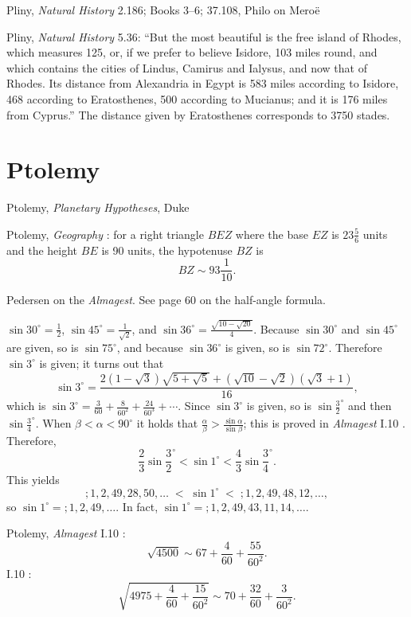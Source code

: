 \documentclass{article}
\theoremstyle{definition}
\begin{document}
Pliny, {\em Natural History} 2.186; Books 3--6; 37.108, Philo on Mero\"e

Pliny, {\em Natural History} 5.36: ``But the most beautiful is the free island of Rhodes, which measures 125, or, if we prefer to believe
Isidore, 103 miles round, and which contains the cities of Lindus, Camirus and Ialysus, and now that
of Rhodes. Its distance from Alexandria in Egypt
is 583 miles according to Isidore, 468 according to Eratosthenes, 500 according to Mucianus; and it is 176 miles from Cyprus.''
The distance given by Eratosthenes corresponds to 3750 stades.




\section{Ptolemy}
Ptolemy, {\em Planetary Hypotheses}, Duke \cite{duke}

Ptolemy, {\em Geography} \cite[p.~90]{geography}: for a right triangle $BEZ$ where the base $EZ$ is $23 \frac{5}{6}$ units and the height
$BE$ is 90 units, the hypotenuse $BZ$ is
\[
BZ \sim 93 \frac{1}{10}.
\]

Pedersen \cite{pedersen} on the {\em Almagest}. See page 60 on the half-angle formula.

$\sin 30^\circ = \frac{1}{2}$, $\sin 45^\circ = \frac{1}{\sqrt{2}}$, and $\sin 36^\circ = \frac{\sqrt{10-\sqrt{20}}}{4}$.
Because
$\sin 30^\circ$ and $\sin 45^\circ$ are given, so is $\sin 75^\circ$, and because
$\sin 36^\circ$ is given, so is $\sin 72^\circ$. Therefore
$\sin 3^\circ$ is given; it turns out that
\[
\sin 3^\circ = \frac{2(1-\sqrt{3})\sqrt{5+\sqrt{5}}+(\sqrt{10}-\sqrt{2})(\sqrt{3}+1)}{16},
\] 
which is $\sin 3^\circ = \frac{3}{60}+\frac{8}{60^2}+\frac{24}{60^3}+\cdots$.
Since $\sin 3^\circ$ is given, so is $\sin \frac{3}{2}^\circ$ and then
$\sin \frac{3}{4}^\circ$.  When $\beta<\alpha<90^\circ$ it holds that
$\frac{\alpha}{\beta}>\frac{\sin \alpha}{\sin \beta}$;
this is proved in {\em Almagest} I.10 \cite[pp.~54--55]{almagest}.
Therefore,
\[
\frac{2}{3} \sin \frac{3}{2}^\circ < \sin 1^\circ < \frac{4}{3}\sin \frac{3}{4}^\circ.
\]
This yields
\[
;1,2,49,28,50,\ldots \; < \; \sin 1^\circ  \; < \; ;1,2,49,48,12,\ldots,
\]
so $\sin 1^\circ = ;1,2,49,\ldots$. In fact, $\sin 1^\circ = ;1,2,49,43,11,14,\ldots$. 

Ptolemy, {\em Almagest} I.10 \cite[p.~49]{almagest}:
\[
\sqrt{4500} \sim 67+\frac{4}{60}+\frac{55}{60^2}.
\]
I.10 \cite[p.~49]{almagest}:
\[
\sqrt{4975+\frac{4}{60}+\frac{15}{60^2}} \sim 70+\frac{32}{60}+\frac{3}{60^2}.
\]
\end{document}
